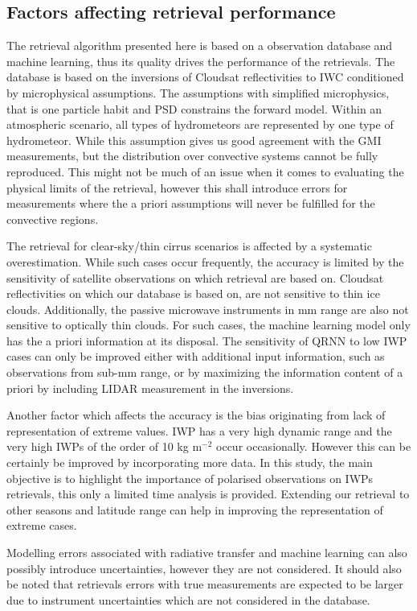 \documentclass[amt, manuscript]{copernicus}
\begin{document}
\subsection{Factors affecting retrieval performance}
%
The retrieval algorithm presented here is based on a observation database and machine learning, thus its quality drives the performance of the retrievals. The database is based on the inversions of Cloudsat reflectivities to IWC conditioned by microphysical assumptions. The assumptions with simplified microphysics, that is one particle habit and PSD constrains the forward model. Within an atmospheric scenario, all types of hydrometeors are represented by one type of hydrometeor. While this assumption gives us good agreement with the GMI measurements, but the distribution over convective systems cannot be fully reproduced. This might not be much of an issue when it comes to evaluating the physical limits of the retrieval, however this shall introduce errors for measurements where the a priori assumptions will never be fulfilled for the convective regions.

The retrieval for clear-sky/thin cirrus scenarios is affected by a systematic overestimation. While such cases occur frequently, the accuracy is limited by the sensitivity of satellite observations on which retrieval are based on. Cloudsat reflectivities on which our database is based on, are not sensitive to thin ice clouds. Additionally, the passive microwave instruments in mm range are also not sensitive to optically thin clouds. For such cases, the machine learning model only has the a priori information at its disposal. The sensitivity of QRNN to low IWP cases can only be improved either with additional input information, such as observations from sub-mm range, or by maximizing the information content of a priori by including LIDAR measurement in the inversions.

Another factor which affects the accuracy is the bias originating from lack of representation of extreme values. IWP has a very high dynamic range and the very high IWPs of the order of 10\,\,kg m$^{-2}$ occur occasionally. However this can be certainly be improved by incorporating more data. In this study, the main objective is to highlight the importance of polarised observations on IWPs retrievals, this only a limited time analysis is provided. Extending our retrieval to other seasons and latitude range can help in improving the representation of extreme cases. 

Modelling errors associated with radiative transfer and machine learning can also possibly introduce uncertainties, however they are not considered. It should also be noted that retrievals errors with true measurements are expected to be larger due to instrument uncertainties which are not considered in the database. 
\end{document}

